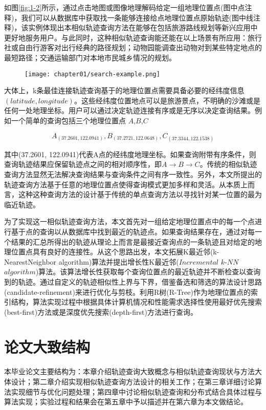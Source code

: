 如图\ref{fig:1-2}所示，通过点击地图或图像地理解码给定一组地理位置点(图中点注释)，我们可以从数据库中获取找一条能够连接给点地理位置点原始轨迹(图中线注释)，该实例体现出本相似轨迹查询方法在能够在包括旅游路线规划等新兴应用中更好地服务用户。与此同时，这种相似轨迹查询能还能在以上场景有所应用：旅行社或自由行游客对出行经典的路径规划；动物园能调查出动物对到某些特定地点的最短路径；交通运输部门对本地市民城乡情况的规划。

\begin{figure}[!htp]
  \centering
  \texttt{[image: chapter01/search-example.png]}
\end{figure}

大体上，k条最佳连接轨迹查询基于的地理位置点需要具备必要的经纬度信息$(latitude,longitude)$。这些经纬度位置地点可以是旅游景点，不明确的沙滩或是任何一处地理坐标。用户可以通过决定轨迹连接有序或是无序以决定查询结果。例如一个简单的查询包括三个地理位置点 $A$,$B$,$C$

\begin{displaymath}
	{A_{(37.2601, 122.0941)}, B_{(37.2721, 122.0648)}, C_{(37.3344,122.1538)}}
\end{displaymath}

其中(37.2601, 122.0941)代表A点的经纬度地理坐标。如果查询附带有序条件，则查询轨迹结果应保留轨迹点之间的相对顺序性，即$A \rightarrow B \rightarrow C$。传统的相似轨迹查询方法显然无法解决查询结果与查询条件之间有序一致性。另外，本文所提出的轨迹查询方法基于任意的地理位置点使得查询模式更加多样和灵活。从本质上而言，这种这种查询方法的设计基于传统的单点查询方法以寻找针对某一位置的最为临近轨迹。

为了实现这一相似轨迹查询方法，本文首先对一组给定地理位置点中的每一个点进行基于点的查询以从数据库中找到最近的轨迹点。如果查询结果存在，通过对每一个结果的汇总所得出的轨迹从理论上而言是最接近查询点的一条轨迹且对给定的地理位置点具有良好的连接性。从这个思路出发，本文拓展K最近邻(k-NearestNeighbor algorithm)算法并提出增长性K最近邻($Incremental$ $k$-$NN$ $algorithm$)算法。该算法增长性获取每个查询位置点的最近轨迹并不断检查以查询到的轨迹。通过自定义的轨迹相似性上界与下界，借鉴备选和筛选的算法设计思路(candidate-refinement)来进行优化与剪枝。利用R树(R-Tree)作为地理位置点的索引结构，算法实现过程中根据具体计算机情况和性能需求选择性使用最好优先搜索(best-first)方法或是深度优先搜索(depth-first)方法进行查询。
\\

\section{论文大致结构}
\label{sec:requirements}
本毕业论文主要结构为：本章介绍轨迹查询大致概念与相似轨迹查询现状与方法大体设计；第二章介绍实现相似轨迹查询方法设计的相关工作；在第三章详细讨论算法实现细节与优化问题处理；第四章中讨论相似轨迹查询和分布式结合具体过程与算法实现；实验过程和结果会在第五章中予以描述并在第六章为本文做结论。
\\

